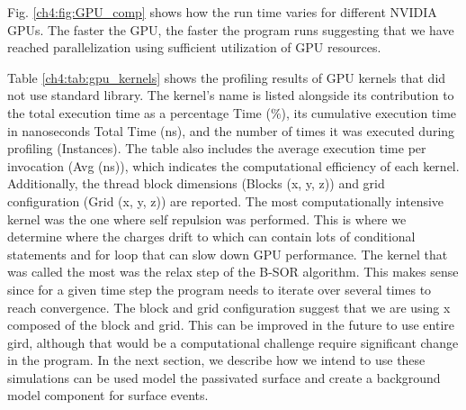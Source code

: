 Fig. \ref{ch4:fig:GPU_comp} shows how the run time varies for different NVIDIA GPUs. The faster the GPU, the faster the program runs suggesting that we have reached parallelization using sufficient utilization of GPU resources.


Table \ref{ch4:tab:gpu_kernels} shows the profiling results of GPU kernels that did not use standard library. The kernel's name is listed alongside its contribution to the total execution time as a percentage Time (\%), its cumulative execution time in nanoseconds Total Time (ns), and the number of times it was executed during profiling (Instances). The table also includes the average execution time per invocation (Avg (ns)), which indicates the computational efficiency of each kernel. Additionally, the thread block dimensions (Blocks (x, y, z)) and grid configuration (Grid (x, y, z)) are reported. The most computationally intensive kernel was the one where self repulsion was performed. This is where we determine where the charges drift to which can contain lots of conditional statements and for loop that can slow down GPU performance. The kernel that was called the most was the relax step of the B-SOR algorithm. This makes sense since for a given time step the program needs to iterate over several times to reach convergence. The block and grid configuration suggest that we are using x composed of the block and grid. This can be improved in the future to use entire gird, although that would be a computational challenge require significant change in the program. In the next section, we describe how we intend to use these simulations can be used model the passivated surface and create a background model component for surface events.

